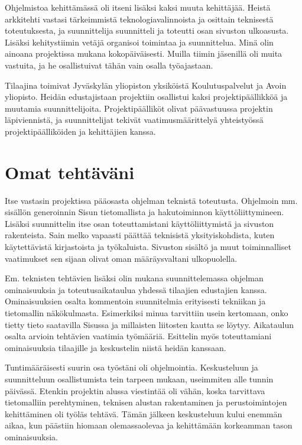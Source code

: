 \documentclass[11pt]{article}
\begin{document}
Ohjelmistoa kehittämässä oli itseni lisäksi kaksi muuta kehittäjää. Heistä arkkitehti
vastasi tärkeimmistä teknologiavalinnoista ja osittain teknisestä toteutuksesta,
ja suunnittelija suunnitteli ja toteutti osan sivuston ulkoasusta.
Lisäksi kehitystiimin vetäjä organisoi toi\-mintaa ja suunnittelua.
Minä olin ainoana projektissa mukana kokopäiväisesti. Muilla tiimin jäsenillä
oli muita vastuita, ja he osallistuivat tähän vain osalla työajastaan.

Tilaajina toimivat Jyväskylän yliopiston yksiköistä Koulutuspalvelut ja Avoin
yliopisto. Heidän edustajistaan projektiin osallistui kaksi projektipäällikköä
ja muutamia suunnittelijoita. Projektipäälli\-köt olivat päävastuussa projektin
läpiviennistä, ja suunnittelijat tekivät vaatimusmäärittelyä yhteistyös\-sä
projektipäälliköiden ja kehittäjien kanssa.

\section{Omat tehtäväni}

Itse vastasin projektissa pääosasta ohjelman teknistä toteutusta. Ohjelmoin mm.
sisällön generoinnin Sisun tietomallista ja hakutoiminnon käyttöliittymineen.
Lisäksi suunnittelin itse osan toteuttamistani käyttöliittymistä ja sivuston
rakenteista. Sain melko vapaasti päättää teknisistä yksityiskohdista, kuten
käytettävistä kirjastoista ja työkaluista. Sivuston sisältö ja muut
toiminnalliset vaatimukset sen sijaan olivat oman määräysvaltani ulko\-puolella.

Em. teknisten tehtävien lisäksi olin mukana suunnittelemassa ohjelman
ominaisuuksia ja toteutusaikataulua yhdessä tilaajien edustajien kanssa.
Ominaisuuksien osalta kommentoin suunnitelmia erityisesti tekniikan ja
tietomallin näkökulmasta. Esimerkiksi minua tar\-vittiin usein kertomaan, onko tietty tieto
saatavilla Sisussa ja millaisten liitosten kautta se löytyy. Aikataulun osalta
arvioin tehtävien vaatimia työmääriä. Esittelin myös toteuttamiani
ominaisuuksia tilaajille ja keskustelin niistä heidän kanssaan.

Tuntimääräisesti suurin osa työstäni oli ohjelmointia. Keskusteluun ja
suunnitteluun osallistumista tein tarpeen mukaan, useimmiten alle tunnin
päivässä. Etenkin projektin alussa viestintää oli vähän, koska tarvittava
tietomalliin perehtyminen, teknisen alustan rakentaminen ja perustoimintojen
kehittäminen oli työläs tehtävä. Tämän jälkeen keskusteluun kului enemmän
aikaa, kun päästiin hio\-maan olemassaolevaa ja kehittämään korkeamman tason
ominaisuuksia.
\end{document}
